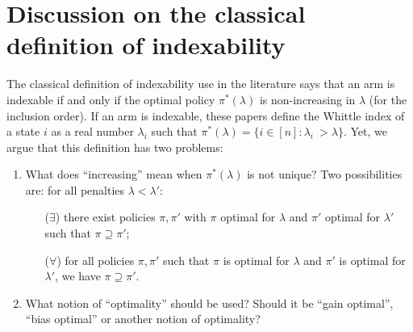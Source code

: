 
\section{Discussion on the classical definition of indexability}
\label{ch:idx:sec:classic_idx}

The classical definition of indexability use in the literature \citep{whittle1996optimal,akbarzadeh2020conditions,nino2020fast,gibson2021novel,nakhleh2021neurwin} says that an arm is indexable if and only if the optimal policy $\pi^*(\lambda)$ is non-increasing in $\lambda$ (for the inclusion order).
If an arm is indexable, these papers define the Whittle index of a state $i$ as a real number $\lambda_i$ such that ${\pi^*(\lambda)=\{i\in[n]: \lambda_i\ > \lambda\}}$.
Yet, we argue that this definition has two problems:
\begin{enumerate}
    \item What does ``increasing'' mean when $\pi^*(\lambda)$ is not unique? Two possibilities are: for all penalties $\lambda<\lambda'$:
    \begin{enumerate}
        \item[($\exists$)] there exist policies $\pi,\pi'$ with $\pi$ optimal for $\lambda$ and $\pi'$ optimal for $\lambda'$ such that $\pi\supseteq\pi'$;
        \item[($\forall$)] for all policies $\pi,\pi'$ such that  $\pi$ is optimal for $\lambda$ and $\pi'$ is optimal for $\lambda'$, we have $\pi\supseteq\pi'$.
    \end{enumerate}
    \item What notion of ``optimality'' should be used? Should it be ``gain optimal'', ``bias optimal'' or another notion of optimality?
\end{enumerate}


